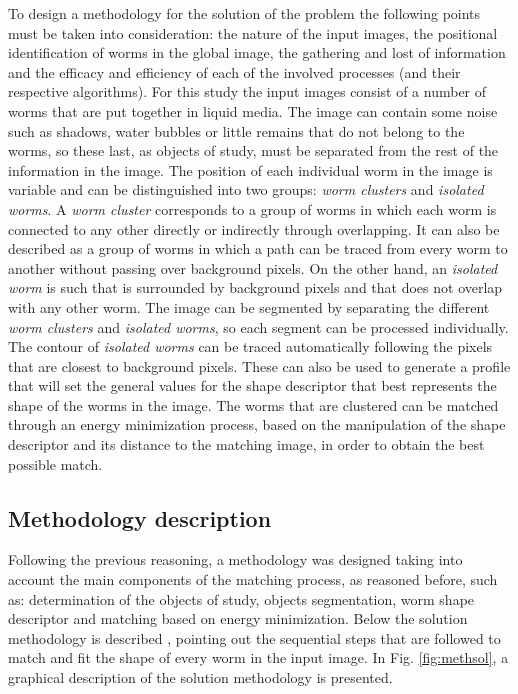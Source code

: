To design a methodology for the solution of the problem the following
points must be taken into consideration: the nature of the input
images, the positional identification of worms in the global image,
the gathering and lost of information and the efficacy and efficiency
of each of the involved processes (and their respective algorithms).
For this study the input images consist of a number of worms that
are put together in liquid media. The image can contain some noise such as
shadows, water bubbles or little remains that do not belong to the worms, so
these last, as objects of study, must be separated from the rest of 
the information in the image. The position of each individual
worm in the image is variable and can be distinguished into two 
groups: \emph{worm clusters} and \emph{isolated worms}. A 
\emph{worm cluster} corresponds to a group of worms in which 
each worm is connected to any other directly or indirectly
through overlapping. It can also be described as a group of worms in which a 
path can be traced from every worm to another without passing over 
background pixels. On the other hand, an \emph{isolated worm} is such
that is surrounded by background pixels and that does not overlap
with any other worm. The image can be segmented by separating the different 
\emph{worm clusters} and \emph{isolated worms}, so each segment
can be processed individually. The contour of \emph{isolated worms} can be
traced automatically following the pixels that are closest to background pixels.
These can also be used to generate a profile that will set the general values
for the shape descriptor that best represents the shape of the worms in the image.
The worms that are clustered can be matched through an energy minimization
process, based on the manipulation of the shape descriptor and its distance
to the matching image, in order to obtain the best possible match.

\subsection{Methodology description}
\label{met:description}

Following the previous reasoning, a methodology was designed taking into account
the main components of the matching process, as reasoned before, such as: 
determination of the objects 
of study, objects segmentation, worm shape descriptor and matching based on 
energy minimization.
Below the solution methodology is described , pointing out the sequential steps
that are followed to match and fit the shape of every worm in the input image.
In Fig. \ref{fig:methsol}, a graphical description of the solution methodology is
presented.\\

